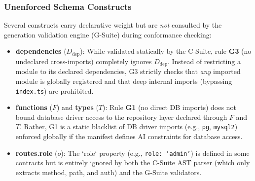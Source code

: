 \subsubsection{Unenforced Schema Constructs}

Several constructs carry declarative weight but are \emph{not} consulted by the generation validation engine (G-Suite) during conformance checking:

\begin{itemize}
    \item \textbf{dependencies} ($D_{\text{dep}}$): While validated statically by the C-Suite, rule \textbf{G3} (no undeclared cross-imports) completely ignores $D_{\text{dep}}$. Instead of restricting a module to its declared dependencies, G3 strictly checks that \emph{any} imported module is globally registered and that deep internal imports (bypassing \texttt{index.ts}) are prohibited.
    \item \textbf{functions} ($F$) and \textbf{types} ($T$): Rule \textbf{G1} (no direct DB imports) does not bound database driver access to the repository layer declared through $F$ and $T$. Rather, G1 is a static blacklist of DB driver imports (e.g., \texttt{pg}, \texttt{mysql2}) enforced globally if the manifest defines AI constraints for database access.
    \item \textbf{routes.role} ($o$): The `role` property (e.g., \texttt{role: 'admin'}) is defined in some contracts but is entirely ignored by both the C-Suite AST parser (which only extracts method, path, and auth) and the G-Suite validators. %
\end{itemize}

